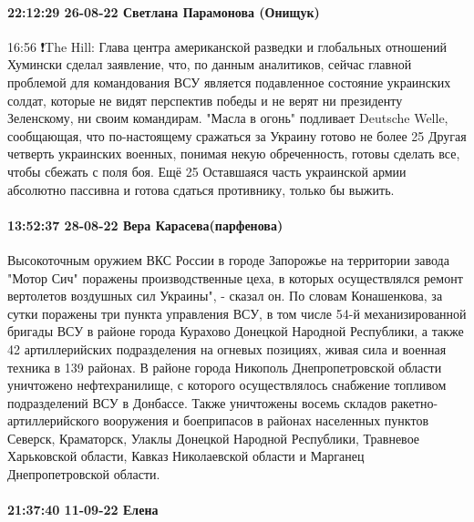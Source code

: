 \paragraph{22:12:29 26-08-22 Светлана Парамонова (Онищук)}
16:56
❗️The Hill: Глава центра американской разведки и глобальных отношений Хумински сделал заявление, что, по данным аналитиков, сейчас главной проблемой для командования ВСУ является подавленное состояние украинских солдат, которые не видят перспектив победы и не верят ни президенту Зеленскому, ни своим командирам.
"Масла в огонь" подливает Deutsche Welle, сообщающая, что по-настоящему сражаться за Украину готово не более 25%
Другая четверть украинских военных, понимая некую обреченность, готовы сделать все, чтобы сбежать с поля боя.
Ещё 25%
Оставшаяся часть украинской армии абсолютно пассивна и готова сдаться противнику, только бы выжить.

\paragraph{13:52:37 28-08-22 Вера Карасева(парфенова)}

Высокоточным оружием ВКС России в городе Запорожье на территории завода "Мотор Сич" поражены производственные цеха, в которых осуществлялся ремонт вертолетов воздушных сил Украины", - сказал он.
По словам Конашенкова, за сутки поражены три пункта управления ВСУ, в том числе 54-й механизированной бригады ВСУ в районе города Курахово Донецкой Народной Республики, а также 42 артиллерийских подразделения на огневых позициях, живая сила и военная техника в 139 районах.
В районе города Никополь Днепропетровской области уничтожено нефтехранилище, с которого осуществлялось снабжение топливом подразделений ВСУ в Донбассе. Также уничтожены восемь складов ракетно-артиллерийского вооружения и боеприпасов в районах населенных пунктов Северск, Краматорск, Улаклы Донецкой Народной Республики, Травневое Харьковской области, Кавказ Николаевской области и Марганец Днепропетровской области.

\paragraph{21:37:40 11-09-22 Елена 🍒🍒🍒🍒}

